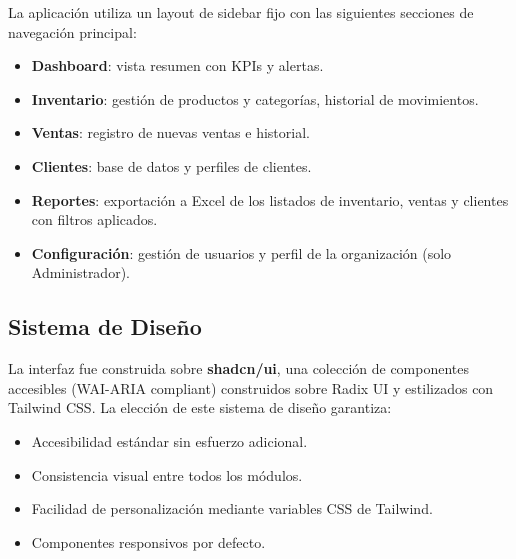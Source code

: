 La aplicación utiliza un layout de sidebar fijo con las siguientes secciones de navegación principal:

\begin{itemize}
\tightlist
\item
  \textbf{Dashboard}: vista resumen con KPIs y alertas.
\item
  \textbf{Inventario}: gestión de productos y categorías, historial de movimientos.
\item
  \textbf{Ventas}: registro de nuevas ventas e historial.
\item
  \textbf{Clientes}: base de datos y perfiles de clientes.
\item
  \textbf{Reportes}: exportación a Excel de los listados de inventario, ventas y clientes con filtros aplicados.
\item
  \textbf{Configuración}: gestión de usuarios y perfil de la organización (solo Administrador).
\end{itemize}

\subsection{Sistema de Diseño}\label{sistema-de-diseuxf1o}

La interfaz fue construida sobre \textbf{shadcn/ui}, una colección de componentes accesibles (WAI-ARIA compliant) construidos sobre Radix UI y estilizados con Tailwind CSS. La elección de este sistema de diseño garantiza:

\begin{itemize}
\tightlist
\item
  Accesibilidad estándar sin esfuerzo adicional.
\item
  Consistencia visual entre todos los módulos.
\item
  Facilidad de personalización mediante variables CSS de Tailwind.
\item
  Componentes responsivos por defecto.
\end{itemize}
